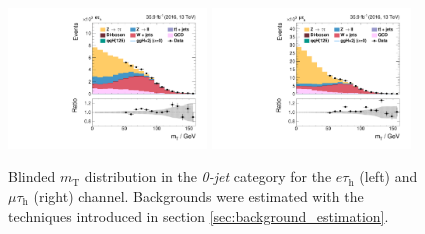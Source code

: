 \begin{figure}[h!]
 \centering
  \includegraphics[width=0.47\textwidth]{Figures/background_estimation/control_plots/et/ZeroJetCP/mt_1.pdf}
  \includegraphics[width=0.47\textwidth]{Figures/background_estimation/control_plots/mt/ZeroJetCP/mt_1.pdf}  
\caption[\textit{W+jets} control plots in the \textit{0-jet} category.]{Blinded $m_\text{T}$ distribution in the \textit{0-jet} category for the $e\tau_\text{h}$ (left) and $\mu\tau_\text{h}$ (right) channel.
Backgrounds were estimated with the techniques introduced in section \ref{sec:background_estimation}.}\label{fig:etmt_wj:wj_control_0jet}
\end{figure}  
